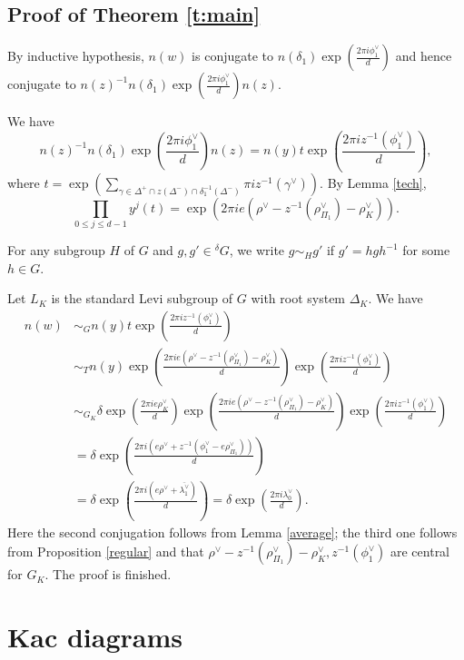 \documentclass[10pt,leqno]{article}
\newtheorem{proposition}[equation]{Proposition}
\newcommand{\qed}{\hfill $\square$ \medskip}
\newenvironment{proof}[1][Proof]{\noindent\textbf{#1.} }{\qed}
\renewcommand{\sec}[1]{\section{#1}
\renewcommand{\theequation}{\thesection.\arabic{equation}}
  \setcounter{equation}{0}}
\newcommand{\g}{\mathfrak g}
\def\le{\leqslant}
\def\g{\gamma}
\def\d{\delta}
\def\D{\Delta}
\def\th{\theta}
\def\l{\lambda}
\def\i{^{-1}}
\renewcommand{\sec}[1]{\section{#1}
\renewcommand{\theequation}{\thesection.\arabic{equation}}
  \setcounter{equation}{0}}
\begin{document}
\subsection{Proof of Theorem \ref{t:main}}
\begin{comment}
\begin{proposition} \label{formula}
Let $e = d\th_1/2\pi$. Then $$n(w) \sim \d \exp(2\pi i\frac{e\rho^\vee + \overline{\l_1^\vee}}{d}).$$
\end{proposition}
Notice that $e\rho^\vee + \overline{\l_1^\vee}$ is dominant and is fixed by $\d$.

\begin{proof}
	Let $\mathcal B =z^{-1}((\D^+ \cap z(\D^-)) - \mathcal F(x z, z^{-1}))$ and $t=\exp (\pi i \sum_{\g \in \mathcal B} \g^\vee)$. Thanks to Lemma \ref{tech} below and that $y$ is elliptic for $\D_K$ we have $$\prod_{0 \le j \le d-1} y^j(t)=\exp(2\pi i e (\rho^\vee-z^{-1}(\rho_J^\vee)-\rho_K^\vee)).$$
\end{comment}
By inductive hypothesis, $n(w)$ is conjugate to $n(\d_1) \exp(\frac{2 \pi i \phi_1^\vee}{d})$ and hence conjugate to $n(z)^{-1} n(\d_1) \exp(\frac{2 \pi i \phi_1^\vee}{d}) n(z)$.

We have $$n(z)^{-1} n(\d_1) \exp(\frac{2 \pi i \phi_1^\vee}{d}) n(z)=n(y) t \exp(\frac{2 \pi i z^{-1}(\phi_1^\vee)}{d}),$$ where $t=\exp (\sum_{\g \in \D^+ \cap z(\D^-) \cap \d_1 \i(\D^-)} \pi i z^{-1}(\g^\vee))$. By Lemma \ref{tech}, $$\prod_{0 \le j \le d-1} y^j(t)=\exp(2\pi i e (\rho^\vee-z^{-1}(\rho_{\Pi_1}^\vee)-\rho_K^\vee)).$$

For any subgroup $H$ of $G$ and $g, g' \in {}^\d G$, we write $g \sim_H g'$ if $g'=h g h \i$ for some $h \in G$.

Let $L_K$ is the standard Levi subgroup of $G$ with root system $\D_K$. We have \begin{align*} n(w) &\sim_G  n(y) t \exp(\frac{2 \pi i z^{-1}(\phi_1^\vee)}{d}) \\ & \sim_T n(y) \exp(\frac{2\pi i e (\rho^\vee-z^{-1}(\rho_{\Pi_1}^\vee)-\rho_K^\vee)}{d}) \exp(\frac{2 \pi i z^{-1}(\phi_1^\vee)}{d}) \\ & \sim_{G_K} \d \exp(\frac{2 \pi i e \rho_K^\vee}{d}) \exp(\frac{2\pi i e (\rho^\vee-z^{-1}(\rho_{\Pi_1}^\vee)-\rho_K^\vee)}{d}) \exp(\frac{2 \pi i z^{-1}(\phi_1^\vee)}{d}) \\ &=\d \exp(\frac{2\pi i (e\rho^\vee + z^{-1}(\phi_1^\vee - e\rho_{\Pi_1}^\vee))}{d}) \\ &=\d \exp(\frac{2\pi i (e\rho^\vee + \overline{\l_1^\vee})}{d})=\d \exp(\frac{2 \pi i \l_0^\vee}{d}).
\end{align*} Here the second conjugation follows from Lemma \ref{average}; the third one follows from Proposition \ref{regular} and that $\rho^\vee-z^{-1}(\rho_{\Pi_1}^\vee)-\rho_K^\vee, z^{-1}(\phi_1^\vee)$ are central for $G_K$. The proof is finished.
\sec{Kac diagrams}
\label{s:kac}
\end{document}
